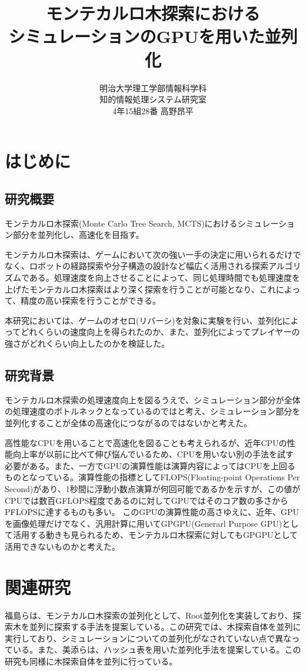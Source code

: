 \documentclass[10pt, a4paper]{jsarticle}
\title{モンテカルロ木探索における\\シミュレーションのGPUを用いた並列化}
\author{明治大学理工学部情報科学科\\知的情報処理システム研究室\\4年15組28番 高野昂平}
\date{}
\begin{document}
\maketitle
\newpage
\tableofcontents
\newpage
\section{はじめに}
\subsection{研究概要}
モンテカルロ木探索(Monte Carlo Tree Search, MCTS)におけるシミュレーション部分を並列化し、高速化を目指す。
\par モンテカルロ木探索は、ゲームにおいて次の強い一手の決定に用いられるだけでなく、ロボットの経路探索や分子構造の設計など幅広く活用される探索アルゴリズムである。処理速度を向上させることによって、同じ処理時間でも処理速度を上げたモンテカルロ木探索はより深く探索を行うことが可能となり、これによって、精度の高い探索を行うことができる。
\par 本研究においては、ゲームのオセロ(リバーシ)を対象に実験を行い、並列化によってどれくらいの速度向上を得られたのか、また、並列化によってプレイヤーの強さがどれくらい向上したのかを検証した。
\subsection{研究背景}
モンテカルロ木探索の処理速度向上を図るうえで、シミュレーション部分が全体の処理速度のボトルネックとなっているのではと考え、シミュレーション部分を並列化することが全体の高速化につながるのではないかと考えた。\par
高性能なCPUを用いることで高速化を図ることも考えられるが、近年CPUの性能向上率が以前に比べて伸び悩んでいるため、CPUを用いない別の手法を試す必要がある。また、一方でGPUの演算性能は演算内容によってはCPUを上回るものとなっている。演算性能の指標としてFLOPS(Floating-point Operations Per Second)があり、1秒間に浮動小数点演算が何回可能であるかを示すが、この値がCPUでは数百GFLOPS程度であるのに対してGPUではそのコア数の多さからPFLOPSに達するものも多い。
このGPUの演算性能の高さゆえに、近年、GPUを画像処理だけでなく、汎用計算に用いてGPGPU(Generarl Purpose GPU)として活用する動きも見られるため、モンテカルロ木探索に対してもGPGPUとして活用できないものかと考えた。
\section{関連研究}
福島らは、モンテカルロ木探索の並列化として、Root並列化を実装しており、探索木を並列に探索する手法を提案している\cite{bib:paper1}。この研究では、木探索自体を並列に実行しており、シミュレーションについての並列化がなされていない点で異なっている。また、美添らは、ハッシュ表を用いた並列化手法を提案している\cite{bib:paper2}。この研究も同様に木探索自体を並列に行っている。
\end{document}
